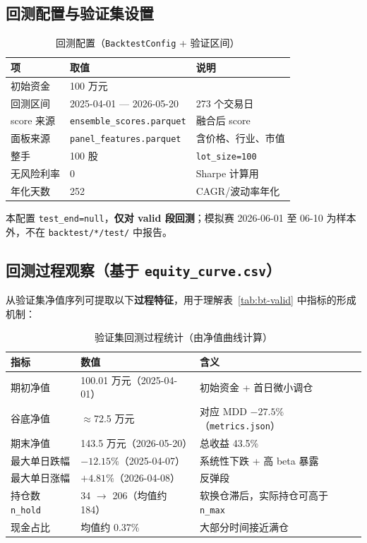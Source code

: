 \documentclass[UTF8,a4paper,12pt]{ctexart}
\begin{document}
\subsection{回测配置与验证集设置}

\begin{table}[H]
\centering
\caption{回测配置（\texttt{BacktestConfig} + 验证区间）}
\label{tab:bt-config}
\begin{tabular}{llp{4.8cm}}
\toprule
\textbf{项} & \textbf{取值} & \textbf{说明} \\
\midrule
初始资金 & 100 万元 & \\
回测区间 & 2025-04-01 --- 2026-05-20 & 273 个交易日 \\
score 来源 & \texttt{ensemble\_scores.parquet} & 融合后 score \\
面板来源 & \texttt{panel\_features.parquet} & 含价格、行业、市值 \\
整手 & 100 股 & \texttt{lot\_size=100} \\
无风险利率 & 0 & Sharpe 计算用 \\
年化天数 & 252 & CAGR/波动率年化 \\
\bottomrule
\end{tabular}
\end{table}

本配置 \texttt{test\_end=null}，\textbf{仅对 valid 段回测}；模拟赛 2026-06-01 至 06-10 为样本外，不在 \texttt{backtest/*/test/} 中报告。

\subsection{回测过程观察（基于 \texttt{equity\_curve.csv}）}

从验证集净值序列可提取以下\textbf{过程特征}，用于理解表~\ref{tab:bt-valid} 中指标的形成机制：

\begin{table}[H]
\centering
\caption{验证集回测过程统计（由净值曲线计算）}
\label{tab:bt-process}
\small
\begin{tabular}{llp{5.5cm}}
\toprule
\textbf{指标} & \textbf{数值} & \textbf{含义} \\
\midrule
期初净值 & 100.01 万元（2025-04-01） & 初始资金 + 首日微小调仓 \\
谷底净值 & $\approx$72.5 万元 & 对应 MDD $\mathbf{-27.5\%}$（\texttt{metrics.json}） \\
期末净值 & 143.5 万元（2026-05-20） & 总收益 43.5\% \\
最大单日跌幅 & $-12.15\%$（2025-04-07） & 系统性下跌 + 高 beta 暴露 \\
最大单日涨幅 & $+4.81\%$（2026-04-08） & 反弹段 \\
持仓数 \texttt{n\_hold} & 34 $\to$ 206（均值约 184） & 软换仓滞后，实际持仓可高于 \texttt{n\_max} \\
现金占比 & 均值约 0.37\% & 大部分时间接近满仓 \\
\bottomrule
\end{tabular}
\end{table}
\end{document}

